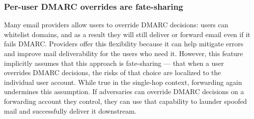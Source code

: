 
%

\subsubsection{Per-user DMARC overrides are fate-sharing}
\label{subsubsec:whitelist}
Many email providers allow users to override DMARC decisions: users can whitelist domains, and as a result they will still deliver or forward email even if it fails DMARC.
Providers offer this flexibility because it can help mitigate
errors and improve mail deliverability for the users who need it.
However, this feature implicitly assumes that this approach is
fate-sharing --- that when a user overrides DMARC decisions, the risks
of that choice are localized to the individual user account.  While
true in the single-hop context, forwarding again undermines this
assumption.  If adversaries can override DMARC decisions on a
forwarding account they control, they can use that capability to
launder spoofed mail and successfully deliver it downstream.


